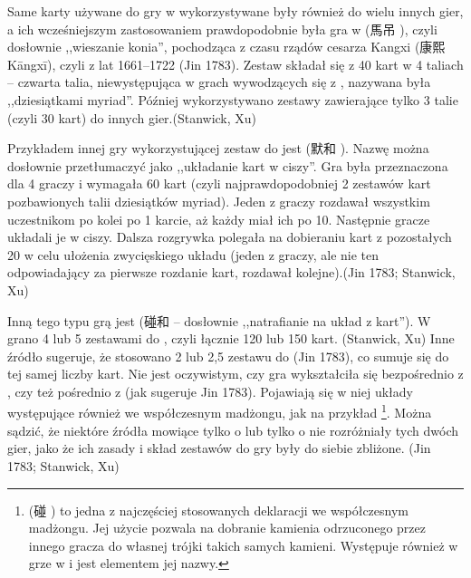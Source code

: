Same karty używane do gry w  wykorzystywane były również do wielu
innych gier, a ich wcześniejszym zastosowaniem prawdopodobnie była gra w
 (馬吊 ), czyli dosłownie ,,wieszanie konia'',
pochodząca z czasu rządów cesarza Kangxi (康熙 Kāngxī), czyli z lat 1661--1722
(Jin 1783).
Zestaw  składał się z 40 kart w 4 taliach -- czwarta talia,
niewystępująca w grach wywodzących się z , nazywana była
,,dziesiątkami myriad''. Później wykorzystywano zestawy zawierające tylko 3
talie (czyli 30 kart) do innych gier.(Stanwick, Xu)

Przykładem innej gry wykorzystującej zestaw do  jest
 (默和 ). Nazwę  można dosłownie przetłumaczyć jako
,,układanie kart w ciszy''. Gra była przeznaczona dla 4 graczy i wymagała 60
kart (czyli najprawdopodobniej 2 zestawów kart  pozbawionych
talii dziesiątków myriad). Jeden z graczy rozdawał wszystkim uczestnikom po
kolei po 1 karcie, aż każdy miał ich po 10. Następnie gracze układali je w
ciszy. Dalsza rozgrywka polegała na dobieraniu kart z pozostałych 20 w celu
ułożenia zwycięskiego układu (jeden z graczy, ale nie ten odpowiadający za
pierwsze rozdanie kart, rozdawał kolejne).(Jin 1783; Stanwick, Xu)
% 


Inną tego typu grą jest  (碰和  -- dosłownie
,,natrafianie na układ z kart'').
W  grano 4 lub 5 zestawami do , czyli łącznie 120
lub 150 kart. (Stanwick, Xu) Inne źródło sugeruje, że stosowano 2 lub 2,5
zestawu do  (Jin 1783), co sumuje się do tej samej liczby kart.
Nie jest oczywistym, czy gra wykształciła się bezpośrednio z ,
czy też pośrednio z  (jak sugeruje Jin 1783).
Pojawiają się w niej układy występujące również we współczesnym madżongu, jak na
przykład \footnote{ (碰 ) to jedna z
 najczęściej stosowanych deklaracji we współczesnym madżongu. Jej użycie pozwala
 na dobranie kamienia odrzuconego przez innego gracza do własnej trójki takich
 samych kamieni. Występuje również w grze w  i jest elementem jej
 nazwy.}. Można sądzić, że niektóre źródła mowiące tylko o  lub
 tylko o  nie rozróżniały tych dwóch gier, jako że ich zasady i
 skład zestawów do gry były do siebie zbliżone. (Jin 1783; Stanwick, Xu)

